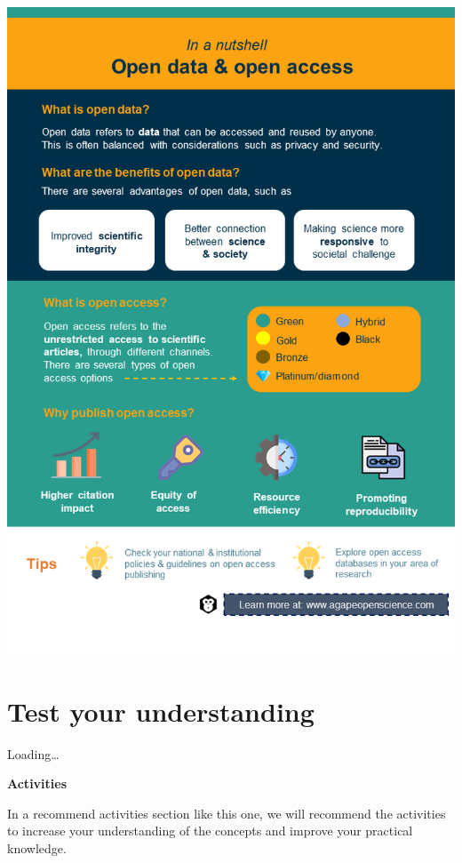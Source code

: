 \documentclass[
]{book}
\begin{document}
\includegraphics[width=5.375in,height=\textheight]{images/slide2.png}

\hypertarget{test-your-understanding-4}{%
\section{Test your understanding}\label{test-your-understanding-4}}

Loading\ldots{}

\textbf{Activities}

In a recommend activities section like this one, we will recommend the activities to increase your understanding of the concepts and improve your practical knowledge.
\end{document}
